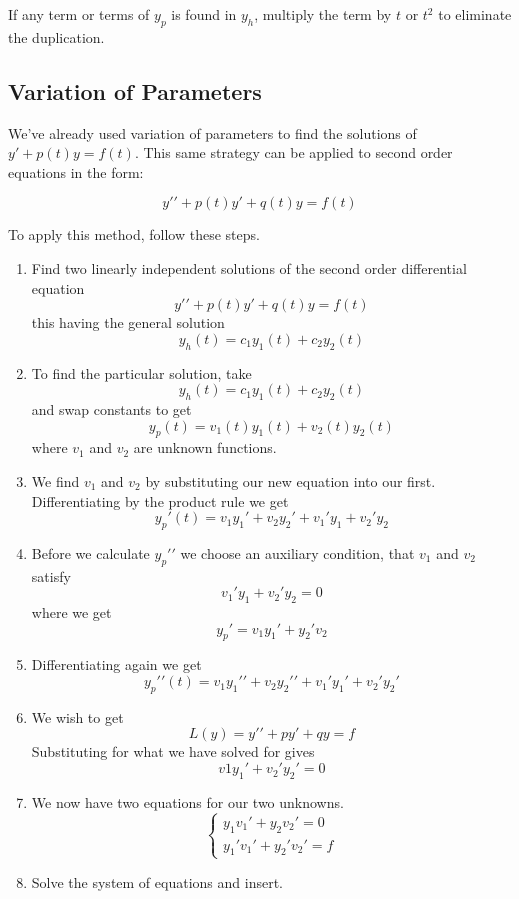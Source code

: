 \documentclass[12pt, landscape, twocolumn]{article}
\begin{document}
    If any term or terms of $y_p$ is found in $y_h$, multiply the term by $t$ or $t^2$ to eliminate the duplication.

    \subsection{Variation of Parameters}
    We've already used variation of parameters to find the solutions of $y\prime + p(t) y = f(t)$. This same strategy can be applied to second order equations in the form:

        \[ y\prime\prime + p(t)y\prime + q(t)y = f(t) \]

    To apply this method, follow these steps.

        \begin{enumerate}
            \item Find two linearly independent solutions of the second order differential equation
                    \[ y\prime\prime + p(t)y\prime + q(t)y = f(t) \]
                this having the general solution
                \[ y_h(t) = c_1 y_1(t) + c_2y_2(t) \]
            \item To find the particular solution, take
                \[ y_h(t) = c_1 y_1(t) + c_2y_2(t) \]
                and swap constants to get
                \[ y_p(t) = v_1(t) y_1(t) + v_2(t)y_2(t) \]
                where $v_1$ and $v_2$ are unknown functions.
            \item We find $v_1$ and $v_2$ by substituting our new equation into our first. Differentiating by the product rule we get
                \[ y_p\prime(t) = v_1 y_1\prime + v_2y_2\prime + v_1\prime y_1 + v_2\prime y_2 \]
            \item Before we calculate $y_p\prime\prime$ we choose an auxiliary condition, that $v_1$ and $v_2$ satisfy
                \[ v_1\prime y_1 + v_2\prime y_2 = 0 \]
                where we get
                \[ y_p \prime = v_1 y_1\prime + y_2\prime v_2 \]
            \item Differentiating again we get
                \[ y_p\prime\prime(t) = v_1 y_1\prime\prime + v_2 y_2\prime\prime + v_1\prime y_1\prime + v_2\prime y_2\prime \]
            \item We wish to get
                \[ L(y) = y\prime\prime + py\prime + qy = f \]
                Substituting for what we have solved for gives
                \[ v1 y_1\prime + v_2\prime y_2\prime = 0 \]
            \item We now have two equations for our two unknowns.
                \[ \begin{cases}
                    y_1 v_1\prime + y_2 v_2\prime = 0\\
                    y_1\prime v_1\prime + y_2\prime v_2\prime = f
                 \end{cases} \]
            \item Solve the system of equations and insert.
        \end{enumerate}
\end{document}
